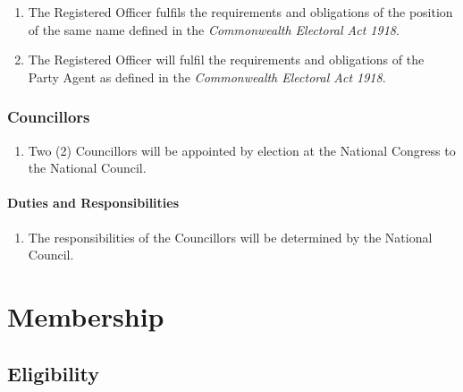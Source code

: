 \documentclass[a4paper,titlepage,8.5pt]{article}
\begin{document}
\begin{enumerate}
\item The Registered Officer fulfils the requirements and obligations of the position of the same name defined in the \textit{Commonwealth Electoral Act 1918}.
\item The Registered Officer will fulfil the requirements and obligations of the Party Agent as defined in the \textit{Commonwealth Electoral Act 1918}.
\end{enumerate}

\subsubsection{Councillors}

\begin{enumerate}
\item Two (2) Councillors will be appointed by election at the National Congress to the National Council.
\end{enumerate}

\paragraph{Duties and Responsibilities}

\begin{enumerate}
\item The responsibilities of the Councillors will be determined by the National Council.
\end{enumerate}

\section{Membership}

\subsection{Eligibility}
\end{document}
